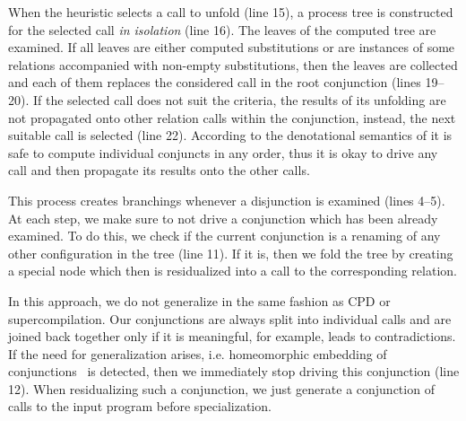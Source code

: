 When the heuristic selects a call to unfold (line 15), a process tree is constructed for the selected call \emph{in isolation} (line 16).
The leaves of the computed tree are examined.
If all leaves are either computed substitutions or are instances of some relations accompanied with non-empty substitutions, then the leaves are collected and each of them replaces the considered call in the root conjunction (lines 19--20).
If the selected call does not suit the criteria, the results of its unfolding are not propagated onto other relation calls within the conjunction, instead, the next suitable call is selected (line 22).
According to the denotational semantics of \mk it is safe to compute individual conjuncts in any order, thus it is okay to drive any call and then propagate its results onto the other calls.


This process creates branchings whenever a disjunction is examined (lines 4--5).
At each step, we make sure to not drive a conjunction which has been already examined.
To do this, we check if the current conjunction is a renaming of any other configuration in the tree (line 11).
If it is, then we fold the tree by creating a special node which then is residualized into a call to the corresponding relation.

In this approach, we do not generalize in the same fashion as CPD or supercompilation.
Our conjunctions are always split into individual calls and are joined back together only if it is meaningful, for example, leads to contradictions.
If the need for generalization arises, i.e. homeomorphic embedding of conjunctions~\cite{de1999conjunctive} is detected, then we immediately stop driving this conjunction (line 12).
When residualizing such a conjunction, we just generate a conjunction of calls to the input program before specialization.


